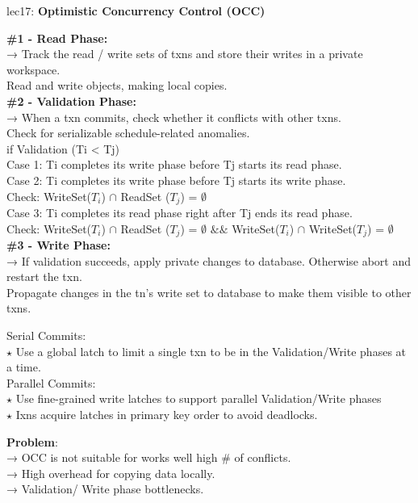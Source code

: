 \documentclass[letterpaper,11pt]{exam}
\begin{document}
\vspace*{0cm}
lec17: \textbf{Optimistic Concurrency Control (OCC)} \\ 
\begin{adjustwidth}{2em}{0pt}
  \textbf{\#1 - Read Phase:} \\
  → Track the read / write sets of txns and store their writes in a private workspace. \\
  Read and write objects, making local copies. \\

  \textbf{\#2 - Validation Phase:} \\
  → When a txn commits, check whether it conflicts with other txns. \\
  Check for serializable schedule-related anomalies. \\
  
  if Validation (Ti < Tj) \\
  Case 1: Ti completes its write phase before Tj starts its read phase. \\  
  Case 2: Ti completes its write phase before Tj starts its write phase. \\
  \hspace*{1em}Check: WriteSet($T_i$) $\cap$ ReadSet ($T_j$) = $\emptyset$ \\
  Case 3: Ti completes its read phase right after Tj ends its read phase. \\
  \hspace*{1em}Check: WriteSet($T_i$) $\cap$ ReadSet ($T_j$) = $\emptyset$ $\&\&$ WriteSet($T_i$) $\cap$ WriteSet($T_j$) = $\emptyset$ \\

  \textbf{\#3 - Write Phase:} \\
  → If validation succeeds, apply private changes to database. Otherwise abort and restart the txn. \\
  Propagate changes in the tn's write set to database to make them visible to other txns. \\
  \begin{adjustwidth}{1em}{0pt}
  Serial Commits: \\
  $\star$ Use a global latch to limit a single txn to be in the Validation/Write phases at a time. \\
  
  Parallel Commits: \\
  $\star$ Use fine-grained write latches to support parallel Validation/Write phases \\
  $\star$ Ixns acquire latches in primary key order to avoid deadlocks. \\
  \end{adjustwidth}

  \textbf{Problem}: \\
  → OCC is not suitable for works well high \# of conflicts. \\
  → High overhead for copying data locally. \\
  → Validation/ Write phase bottlenecks. \\
\end{adjustwidth}
\end{document}
